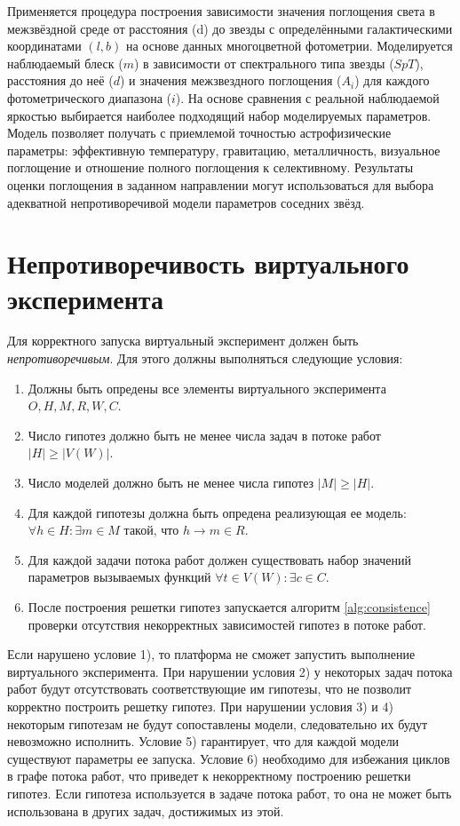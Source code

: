 Применяется процедура построения зависимости значения поглощения света в межзвёздной среде от расстояния 
(d) до звезды с определёнными галактическими координатами $(l, b)$ на основе данных многоцветной фотометрии. 
Моделируется наблюдаемый блеск ($m$) в зависимости от спектрального типа звезды ($SpT$), расстояния до неё ($d$) 
и значения межзвездного поглощения ($A_i$) для каждого фотометрического диапазона ($i$). На основе сравнения с 
реальной наблюдаемой яркостью выбирается наиболее подходящий набор моделируемых параметров. Модель позволяет 
получать с приемлемой точностью астрофизические параметры: эффективную температуру, гравитацию, металличность, 
визуальное поглощение и отношение полного поглощения к селективному. Результаты оценки поглощения в заданном 
направлении могут использоваться для выбора адекватной непротиворечивой модели параметров соседних звёзд.



\section{Непротиворечивость виртуального эксперимента}\label{sect2_5}
Для корректного запуска виртуальный эксперимент должен быть \textit{непротиворечивым}. 
Для этого должны выполняться следующие условия:
\begin{enumerate}
    \item Должны быть опредены все элементы виртуального эксперимента $O, H, M, R, W, C$.
    \item Число гипотез должно быть не менее числа задач в потоке работ $|H| \geq |V(W)| $.
    \item Число моделей должно быть не менее числа гипотез $|M| \geq |H|$.
    \item Для каждой гипотезы должна быть опредена реализующая ее модель: $ \forall h \in H: \exists m \in M$ такой, 
            что $h \rightarrow m \in R$.
    
    \item Для каждой задачи потока работ должен существовать набор значений параметров вызываемых функций 
            $ \forall t \in V(W): \exists c \in C$.
    \item После построения решетки гипотез запускается алгоритм \ref{alg:consistence} проверки отсутствия 
            некорректных зависимостей гипотез в потоке работ.
\end{enumerate}

Если нарушено условие 1), то платформа не сможет запустить выполнение виртуального эксперимента.
При нарушении условия 2) у некоторых задач потока работ будут отсутствовать соответствующие им гипотезы, что не 
позволит корректно построить решетку гипотез. При нарушении условия 3) и 4) некоторым гипотезам не будут 
сопоставлены модели, следовательно их будут невозможно исполнить. Условие 5) гарантирует, что для каждой модели 
существуют параметры ее запуска. Условие 6) необходимо для избежания циклов в графе потока работ, что приведет к 
некорректному построению решетки гипотез. Если гипотеза используется в задаче потока работ, то она не может быть 
использована в других задач, достижимых из этой. 


